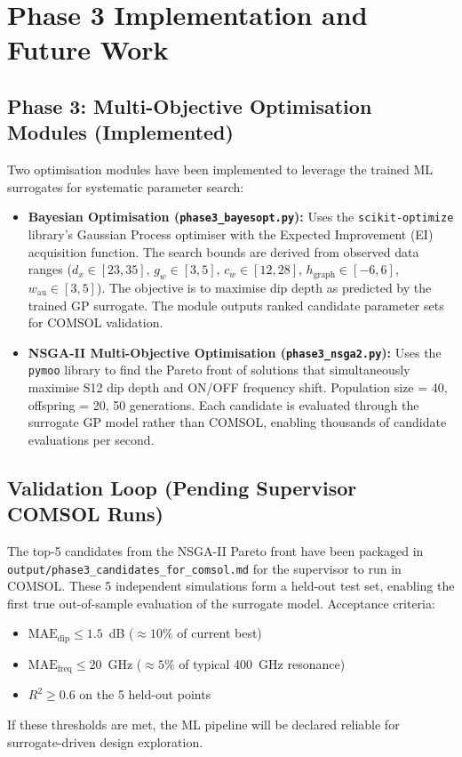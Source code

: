 \documentclass[12pt,a4paper]{report}
\begin{document}
\section{Phase 3 Implementation and Future Work}
\label{sec:future_work}

\subsection{Phase 3: Multi-Objective Optimisation Modules (Implemented)}

Two optimisation modules have been implemented to leverage the trained ML surrogates for systematic parameter search:

\begin{itemize}[leftmargin=2cm]
    \item \textbf{Bayesian Optimisation (\texttt{phase3\_bayesopt.py}):} Uses the \texttt{scikit-optimize} library's Gaussian Process optimiser with the Expected Improvement (EI) acquisition function. The search bounds are derived from observed data ranges ($d_x \in [23, 35]$, $g_w \in [3, 5]$, $c_w \in [12, 28]$, $h_{\text{graph}} \in [-6, 6]$, $w_{\text{au}} \in [3, 5]$). The objective is to maximise dip depth as predicted by the trained GP surrogate. The module outputs ranked candidate parameter sets for COMSOL validation.

    \item \textbf{NSGA-II Multi-Objective Optimisation (\texttt{phase3\_nsga2.py}):} Uses the \texttt{pymoo} library to find the Pareto front of solutions that simultaneously maximise S12 dip depth and ON/OFF frequency shift. Population size = 40, offspring = 20, 50 generations. Each candidate is evaluated through the surrogate GP model rather than COMSOL, enabling thousands of candidate evaluations per second.
\end{itemize}

\subsection{Validation Loop (Pending Supervisor COMSOL Runs)}

The top-5 candidates from the NSGA-II Pareto front have been packaged in \texttt{output/phase3\_candidates\_for\_comsol.md} for the supervisor to run in COMSOL. These 5 independent simulations form a held-out test set, enabling the first true out-of-sample evaluation of the surrogate model. Acceptance criteria:
\begin{itemize}[leftmargin=2cm]
    \item $\text{MAE}_{\text{dip}} \leq 1.5$~dB ($\approx 10\%$ of current best)
    \item $\text{MAE}_{\text{freq}} \leq 20$~GHz ($\approx 5\%$ of typical 400~GHz resonance)
    \item $R^2 \geq 0.6$ on the 5 held-out points
\end{itemize}
If these thresholds are met, the ML pipeline will be declared reliable for surrogate-driven design exploration.
\end{document}

